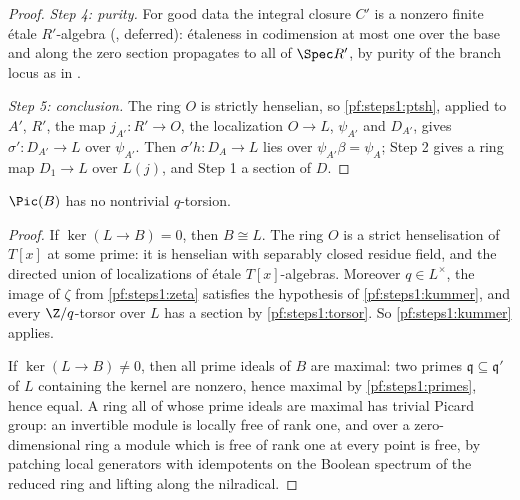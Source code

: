 \begin{proof}
\emph{Step 4: purity.} For good data the integral closure $C'$ is a nonzero finite \'etale $R'$-algebra
(, deferred): \'etaleness in codimension
at most one over the base and along the zero section propagates to all of $\Spec R'$, by purity of the branch locus as in
\cite[Exp.~XV, \S2]{ArtinGrothendieckVerdier1972}.

\emph{Step 5: conclusion.} The ring $O$ is strictly henselian, so \cref{pf:steps1:ptsh}, applied to $A'$, $R'$, the map
$j_{A'}\colon R'\to O$, the localization $O\to L$, $\psi_{A'}$ and $D_{A'}$, gives $\sigma'\colon D_{A'}\to L$ over
$\psi_{A'}$. Then $\sigma'h\colon D_A\to L$ lies over $\psi_{A'}\beta=\psi_A$; Step 2 gives a ring map $D_1\to L$ over
$L(j)$, and Step 1 a section of $D$.
\end{proof}

\begin{lemma}\label{pf:steps1:pic}
$\Pic(B)$ has no nontrivial $q$-torsion.
\end{lemma}

\begin{proof}
If $\ker(L\to B)=0$, then $B\cong L$. The ring $O$ is a strict henselisation of $T[x]$ at some prime: it is henselian
with separably closed residue field, and the directed union of localizations of \'etale $T[x]$-algebras. Moreover
$q\in L^\times$, the image of $\zeta$ from \cref{pf:steps1:zeta} satisfies the hypothesis of \cref{pf:steps1:kummer},
and every $\Z/q$-torsor over $L$ has a section by \cref{pf:steps1:torsor}. So \cref{pf:steps1:kummer} applies.

If $\ker(L\to B)\ne0$, then all prime ideals of $B$ are maximal: two primes $\mathfrak q\subseteq\mathfrak q'$ of $L$
containing the kernel are nonzero, hence maximal by \cref{pf:steps1:primes}, hence equal. A ring all of whose prime
ideals are maximal has trivial Picard group: an invertible module is locally free of rank one, and over a
zero-dimensional ring a module which is free of rank one at every point is free, by patching local generators with
idempotents on the Boolean spectrum of the reduced ring and lifting along the nilradical.
\end{proof}

